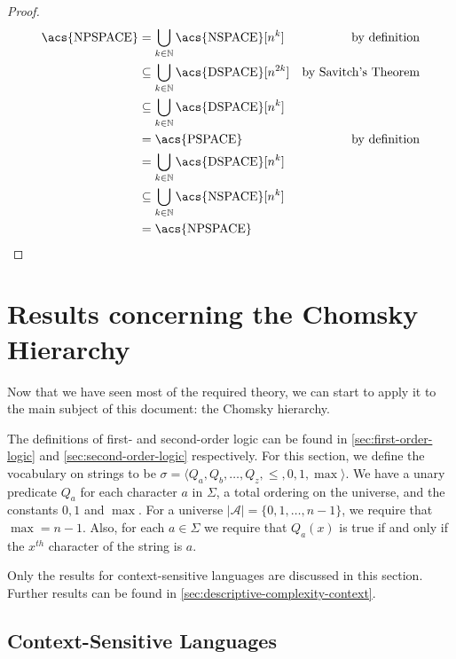 \begin{proof}
    \begin{align*}
        \text{\acs{NPSPACE}} &= \bigcup_{k \in \mathbb{N}}\text{\acs{NSPACE}}[n^k] & \text{by definition} \\
        &\subseteq \bigcup_{k\in \mathbb{N}}\text{\acs{DSPACE}}[n^{2k}] & \text{by Savitch's Theorem} \\
        &\subseteq \bigcup_{k\in \mathbb{N}}\text{\acs{DSPACE}}[n^{k}] \\
        &= \text{\acs{PSPACE}} & \text{by definition} \\
        &= \bigcup_{k\in \mathbb{N}}\text{\acs{DSPACE}}[n^{k}] \\
        &\subseteq \bigcup_{k\in \mathbb{N}}\text{\acs{NSPACE}}[n^{k}] \\
        &= \text{\acs{NPSPACE}}
    \end{align*}
\end{proof}


\section{Results concerning the Chomsky Hierarchy}\label{sec:results-concerning-the-chomsky-hierarchy}

Now that we have seen most of the required theory, we can start to apply it to the main subject of this document: the Chomsky hierarchy.

The definitions of first- and second-order logic can be found in \cref{sec:first-order-logic} and \cref{sec:second-order-logic} respectively.
For this section, we define the vocabulary on strings to be $\sigma = \langle Q_a, Q_b, \dots, Q_z, \leq , 0, 1, \max \rangle$.
We have a unary predicate $Q_a$ for each character $a$ in $\Sigma$, a total ordering on the universe, and the constants $0, 1$ and $\max$.
For a universe $| \mathcal{A} | = \{0, 1, \dots, n - 1\}$, we require that $\max = n - 1$.
Also, for each $a \in \Sigma$ we require that $Q_a(x)$ is true if and only if the $x^{th}$ character of the string is $a$.

Only the results for context-sensitive languages are discussed in this section.
Further results can be found in \cref{sec:descriptive-complexity-context}.

\subsection{Context-Sensitive Languages}\label{subsec:des-context-sensitive-languages}

